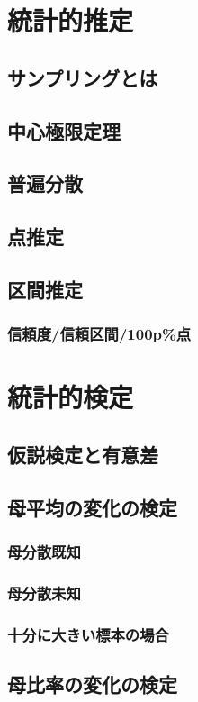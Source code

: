 \documentclass[11pt,a4paper,uplatex]{ujreport} 	%
\begin{document}
\section{統計的推定}

\subsection{サンプリングとは}
\subsection{中心極限定理}
\subsection{普遍分散}
\subsection{点推定}
\subsection{区間推定}
\subsubsection{信頼度/信頼区間/100p\%点}

\section{統計的検定}
\subsection{仮説検定と有意差}
\subsection{母平均の変化の検定}
\subsubsection{母分散既知}
\subsubsection{母分散未知}
\subsubsection{十分に大きい標本の場合}
\subsection{母比率の変化の検定}
\end{document}
